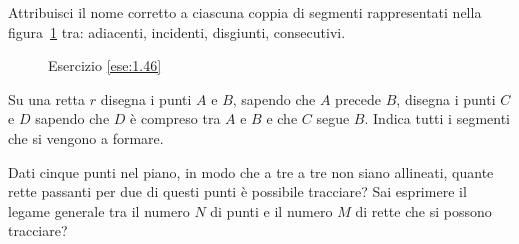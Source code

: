 \begin{esercizio}
\label{ese:1.46}
Attribuisci il nome corretto a ciascuna coppia di segmenti 
rappresentati nella figura~\ref{fig:ese1.46} tra: adiacenti, 
incidenti, disgiunti, consecutivi.
\end{esercizio}


\begin{inaccessibleblock}
 \begin{figure}[htb]
 \centering
 \caption{Esercizio \ref{ese:1.46}}\label{fig:ese1.46}
\end{figure}
\end{inaccessibleblock}

\begin{esercizio}
\label{ese:1.47}
Su una retta \(r\) disegna i punti \(A\) e \(B\), sapendo che \(A\) precede 
\(B\), disegna i punti \(C\) e \(D\) sapendo che \(D\) è compreso tra \(A\) e 
\(B\) e che \(C\) segue \(B\). Indica tutti i segmenti che si vengono a 
formare.
\end{esercizio}

\begin{esercizio}
\label{ese:1.48}
Dati cinque punti nel piano, in modo che a tre a tre non siano 
allineati, quante rette passanti per due di questi punti è possibile 
tracciare? Sai esprimere il legame generale tra il numero \(N\) di 
punti e il numero \(M\) di rette che si possono tracciare?
\end{esercizio}

